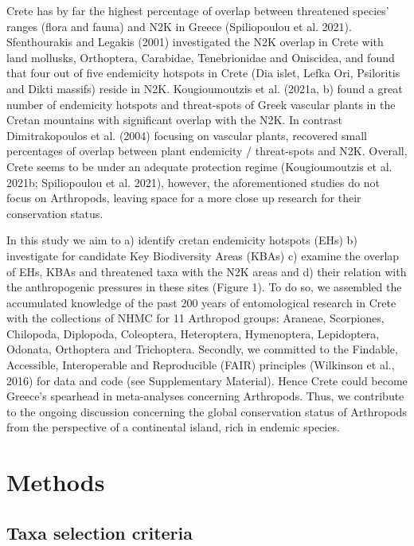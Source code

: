 Crete has by far the highest percentage of overlap between threatened species’
ranges (flora and fauna) and N2K in Greece (Spiliopoulou et al. 2021).
Sfenthourakis and Legakis (2001) investigated the N2K overlap in Crete with
land mollusks, Orthoptera, Carabidae, Tenebrionidae and Oniscidea, and found
that four out of five endemicity hotspots in Crete (Dia islet, Lefka Ori,
Psiloritis and Dikti massifs) reside in N2K. Kougioumoutzis et al. (2021a, b)
found a great number of endemicity hotspots and threat-spots of Greek vascular
plants in the Cretan mountains with significant overlap with the N2K.
In contrast Dimitrakopoulos et al. (2004) focusing on vascular plants,
recovered small percentages of overlap between plant endemicity / threat-spots and N2K.
Overall, Crete seems to be under an adequate protection regime (Kougioumoutzis et al. 2021b; Spiliopoulou et al. 2021),
however, the aforementioned studies do not focus on Arthropods, leaving space
for a more close up research for their conservation status.

In this study we aim to a) identify cretan endemicity hotspots (EHs)
b) investigate for candidate Key Biodiversity Areas (KBAs)
c) examine the overlap of EHs, KBAs and threatened taxa with the N2K areas and
d) their relation with the anthropogenic pressures in these sites (Figure 1).
To do so, we assembled the accumulated knowledge of the past 200 years of
entomological research in Crete with the collections of NHMC for 11 Arthropod groups:
Araneae, Scorpiones, Chilopoda, Diplopoda, Coleoptera, Heteroptera,
Hymenoptera, Lepidoptera, Odonata, Orthoptera and Trichoptera.
Secondly, we committed to the Findable, Accessible, Interoperable and Reproducible (FAIR) principles (Wilkinson et al., 2016)
for data and code (see Supplementary Material). Hence Crete could become Greece’s
spearhead in meta-analyses concerning Arthropods. Thus, we contribute to the
ongoing discussion concerning the global conservation status of Arthropods from
the perspective of a continental island, rich in endemic species.


\section{Methods}
\label{sec:arthropods-method}
   
    \subsection{Taxa selection criteria}
    \label{subsec:arthropods-taxa-selection}

